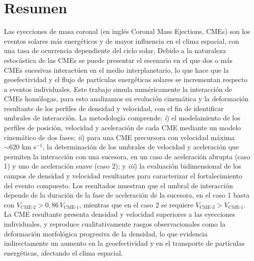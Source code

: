 \chapter*{Resumen}

Las eyecciones de masa coronal (en inglés Coronal Mass Ejections, CMEs) son los eventos solares más energéticos y de mayor influencia en el clima espacial, con una tasa de ocurrencia dependiente del ciclo solar. Debido a la naturaleza estocástica de las CMEs se puede presentar el escenario en el que dos o más CMEs sucesivas interactúen en el medio interplanetario, lo que hace que la geoefectividad y el flujo de partículas energéticas solares se incrementan respecto a eventos individuales. Este trabajo simula numéricamente la interacción de CMEs homólogas, para esto analizamos su evolución cinemática y la deformación resultante de los perfiles de densidad y velocidad, con el fin de identificar umbrales de interacción. La metodología comprende: \emph{i}) el modelamiento de los perfiles de posición, velocidad y aceleración de cada CME mediante un modelo cinemático de dos fases; \emph{ii}) para una CME precursora con velocidad máxima $\sim 620$ km s$^{-1}$, la determinación de los umbrales de velocidad y aceleración que permiten la interacción con una sucesora, en un caso de aceleración abrupta (caso 1) y uno de aceleración suave (caso 2); y \emph{iii}) la evaluación bidimensional de los campos de densidad y velocidad resultantes para caracterizar el fortalecimiento del evento compuesto. Los resultados muestran que el umbral de interacción depende de la duración de la fase de aceleración de la sucesora, en el caso 1 basta con $V_{\text{CME-2}}>0{,}86\,V_{\text{CME-1}}$, mientras que en el caso 2 se requiere $V_{\text{CME-3}}>V_{\text{CME-1}}$. La CME resultante presenta densidad y velocidad superiores a las eyecciones individuales, y reproduce cualitativamente rasgos observacionales como la deformación morfológica progresiva de la densidad, lo que evidencia indirectamente un aumento en la geoefectividad y en el transporte de partículas energéticas, afectando el clima espacial.